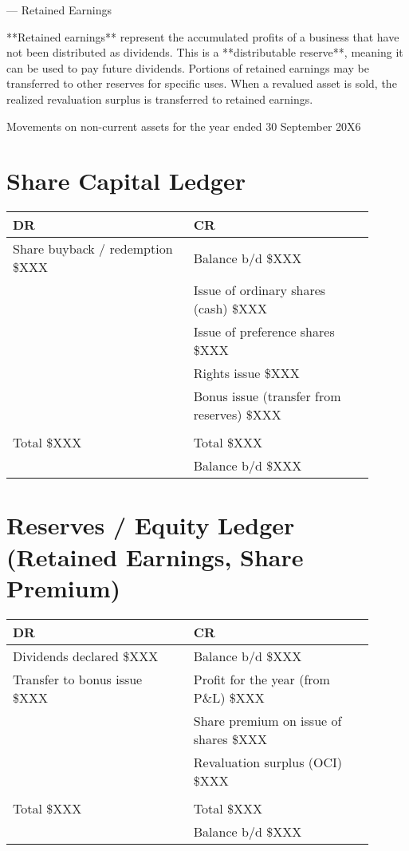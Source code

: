 ---
 Retained Earnings

**Retained earnings** represent the accumulated profits of a business that have not been distributed as dividends. This is a **distributable reserve**, meaning it can be used to pay future dividends. Portions of retained earnings may be transferred to other reserves for specific uses. When a revalued asset is sold, the realized revaluation surplus is transferred to retained earnings.



Movements on non-current assets for the year ended 30 September 20X6

\section*{Share Capital Ledger}

\begin{tabular}{@{}p{0.45\linewidth} p{0.45\linewidth}@{}}
\textbf{DR} & \textbf{CR} \\ \midrule
Share buyback / redemption \hfill \$XXX & Balance b/d \hfill \$XXX \\
& Issue of ordinary shares (cash) \hfill \$XXX \\
& Issue of preference shares \hfill \$XXX \\
& Rights issue \hfill \$XXX \\
& Bonus issue (transfer from reserves) \hfill \$XXX \\[3pt]
\multicolumn{2}{c}{\hrulefill} \\
Total \hfill \$XXX & Total \hfill \$XXX \\[6pt]
& Balance b/d \hfill \$XXX \\
\end{tabular}

\vspace{1cm}

\section*{Reserves / Equity Ledger (Retained Earnings, Share Premium)}

\begin{tabular}{@{}p{0.45\linewidth} p{0.45\linewidth}@{}}
\textbf{DR} & \textbf{CR} \\ \midrule
Dividends declared \hfill \$XXX & Balance b/d \hfill \$XXX \\
Transfer to bonus issue \hfill \$XXX & Profit for the year (from P\&L) \hfill \$XXX \\
& Share premium on issue of shares \hfill \$XXX \\
& Revaluation surplus (OCI) \hfill \$XXX \\[3pt]
\multicolumn{2}{c}{\hrulefill} \\
Total \hfill \$XXX & Total \hfill \$XXX \\[6pt]
& Balance b/d \hfill \$XXX \\
\end{tabular}

